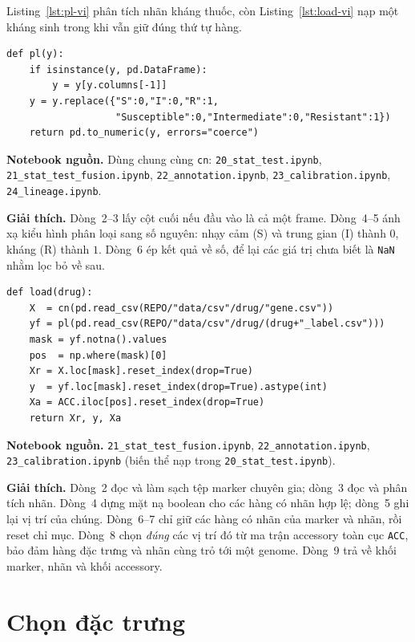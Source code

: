 \documentclass[../main.tex]{subfiles}
\begin{document}
Listing~\ref{lst:pl-vi} phân tích nhãn kháng thuốc, còn Listing~\ref{lst:load-vi} nạp một kháng sinh trong khi vẫn giữ đúng thứ tự hàng.

\begin{lstlisting}[caption={Phân tích nhãn về $\{0,1\}$.},label=lst:pl-vi]
def pl(y):
    if isinstance(y, pd.DataFrame):
        y = y[y.columns[-1]]
    y = y.replace({"S":0,"I":0,"R":1,
                   "Susceptible":0,"Intermediate":0,"Resistant":1})
    return pd.to_numeric(y, errors="coerce")
\end{lstlisting}

\noindent\textbf{Notebook nguồn.} Dùng chung cùng \texttt{cn}: \texttt{20\_stat\_test.ipynb}, \texttt{21\_stat\_test\_fusion.ipynb}, \texttt{22\_annotation.ipynb}, \texttt{23\_calibration.ipynb}, \texttt{24\_lineage.ipynb}.

\noindent\textbf{Giải thích.} Dòng~2--3 lấy cột cuối nếu đầu vào là cả một frame. Dòng~4--5 ánh xạ kiểu hình phân loại sang số nguyên: nhạy cảm (S) và trung gian (I) thành $0$, kháng (R) thành $1$. Dòng~6 ép kết quả về số, để lại các giá trị chưa biết là \texttt{NaN} nhằm lọc bỏ về sau.

\begin{lstlisting}[caption={Nạp một kháng sinh với các hàng accessory đã căn khớp.},label=lst:load-vi]
def load(drug):
    X  = cn(pd.read_csv(REPO/"data/csv"/drug/"gene.csv"))
    yf = pl(pd.read_csv(REPO/"data/csv"/drug/(drug+"_label.csv")))
    mask = yf.notna().values
    pos  = np.where(mask)[0]
    Xr = X.loc[mask].reset_index(drop=True)
    y  = yf.loc[mask].reset_index(drop=True).astype(int)
    Xa = ACC.iloc[pos].reset_index(drop=True)
    return Xr, y, Xa
\end{lstlisting}

\noindent\textbf{Notebook nguồn.} \texttt{21\_stat\_test\_fusion.ipynb}, \texttt{22\_annotation.ipynb}, \texttt{23\_calibration.ipynb} (biến thể nạp trong \texttt{20\_stat\_test.ipynb}).

\noindent\textbf{Giải thích.} Dòng~2 đọc và làm sạch tệp marker chuyên gia; dòng~3 đọc và phân tích nhãn. Dòng~4 dựng mặt nạ boolean cho các hàng có nhãn hợp lệ; dòng~5 ghi lại vị trí của chúng. Dòng~6--7 chỉ giữ các hàng có nhãn của marker và nhãn, rồi reset chỉ mục. Dòng~8 chọn \emph{đúng} các vị trí đó từ ma trận accessory toàn cục \texttt{ACC}, bảo đảm hàng đặc trưng và nhãn cùng trỏ tới một genome. Dòng~9 trả về khối marker, nhãn và khối accessory.

\section{Chọn đặc trưng}
\end{document}
